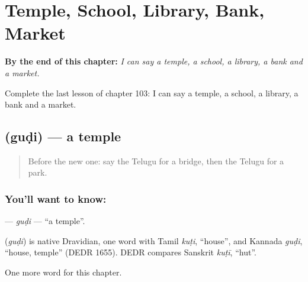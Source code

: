 
\chapter{Temple, School, Library, Bank, Market}
\label{ch:te-temple-school-library-bank-market}

\begin{chapteropening}
\textbf{By the end of this chapter:} \emph{I can say a temple, a school, a library, a bank and a market.}

Complete the last lesson of chapter 103: I can say a temple, a school, a library, a bank and a market.
\end{chapteropening}

\section[\texorpdfstring{\te{గుడి} (guḍi)}{గుడి (guḍi)}]{ (guḍi) — a temple}

\label{lesson:TE-C103-gudi}



\begin{quote}
Before the new one: say the Telugu for a bridge, then the Telugu for a park.
\end{quote}

\subsection*{You'll want to know: }
\textbf{} — \emph{guḍi} — \textquotedblleft{}a temple\textquotedblright{}.

\begin{cousinweb}
\textbf{} (\emph{guḍi}) is native Dravidian, one word with Tamil \emph{kuṭi}, \textquotedblleft{}house\textquotedblright{}, and Kannada \emph{guḍi}, \textquotedblleft{}house, temple\textquotedblright{} (DEDR 1655). DEDR compares Sanskrit \emph{kuṭī}, \textquotedblleft{}hut\textquotedblright{}.
\end{cousinweb}

\begin{grammarlens}[title={What you've built}]
One more word for this chapter.
\end{grammarlens}

